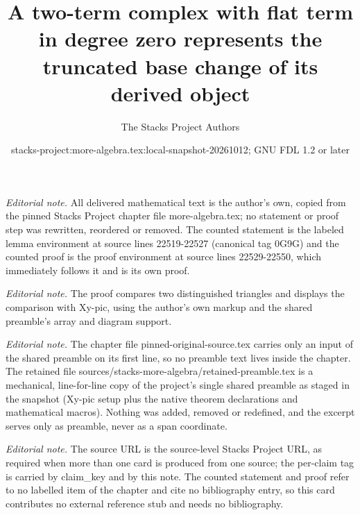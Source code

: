 \documentclass[10pt,a4paper]{amsart}
\title{A two-term complex with flat term in degree zero represents the truncated base change of its derived object}
\author{The Stacks Project Authors}
\date{stacks-project:more-algebra.tex:local-snapshot-20261012; GNU FDL 1.2 or later}
\theoremstyle{plain}
\theoremstyle{definition}
\theoremstyle{remark}
\numberwithin{equation}{subsection}
\begin{document}
\maketitle
\setcounter{subsection}{1}
\noindent\textit{Editorial note.} All delivered mathematical text is the author's own, copied from the pinned Stacks Project chapter file more-algebra.tex; no statement or proof step was rewritten, reordered or removed. The counted statement is the labeled lemma environment at source lines 22519-22527 (canonical tag 0G9G) and the counted proof is the proof environment at source lines 22529-22550, which immediately follows it and is its own proof.\par\medskip
\noindent\textit{Editorial note.} The proof compares two distinguished triangles and displays the comparison with Xy-pic, using the author's own markup and the shared preamble's array and diagram support.\par\medskip
\noindent\textit{Editorial note.} The chapter file pinned-original-source.tex carries only an input of the shared preamble on its first line, so no preamble text lives inside the chapter. The retained file sources/stacks-more-algebra/retained-preamble.tex is a mechanical, line-for-line copy of the project's single shared preamble as staged in the snapshot (Xy-pic setup plus the native theorem declarations and mathematical macros). Nothing was added, removed or redefined, and the excerpt serves only as preamble, never as a span coordinate.\par\medskip
\noindent\textit{Editorial note.} The source URL is the source-level Stacks Project URL, as required when more than one card is produced from one source; the per-claim tag is carried by claim\_key and by this note. The counted statement and proof refer to no labelled item of the chapter and cite no bibliography entry, so this card contributes no external reference stub and needs no bibliography.\par\medskip
\end{document}
